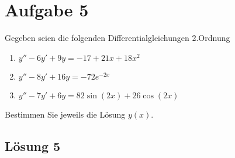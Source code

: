 \documentclass[main.tex]{subfiles}
\begin{document}
\section{Aufgabe 5}
Gegeben seien die folgenden Differentialgleichungen 2.Ordnung
\begin{enumerate}
    \item $y'' - 6y' + 9y = -17 + 21x + 18x^2$
    \item $y'' - 8y' + 16y = -72e^{-2x}$
    \item $y'' - 7y' + 6y = 82\sin(2x) + 26\cos(2x)$
\end{enumerate}
Bestimmen Sie jeweils die Lösung $y(x)$.

\subsection{Lösung 5}
\end{document}
